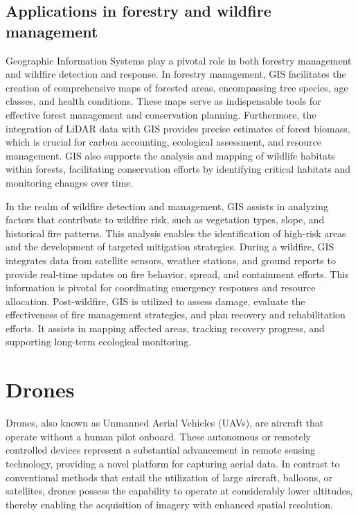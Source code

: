 \documentclass[
  12 pt,
]{Nemilov}
\begin{document}
\subsection{Applications in forestry and wildfire management}\label{applications-in-forestry-and-wildfire-management}

Geographic Information Systems play a pivotal role in both forestry management and wildfire detection and response. In forestry management, GIS facilitates the creation of comprehensive maps of forested areas, encompassing tree species, age classes, and health conditions. These maps serve as indispensable tools for effective forest management and conservation planning. Furthermore, the integration of LiDAR data with GIS provides precise estimates of forest biomass, which is crucial for carbon accounting, ecological assessment, and resource management. GIS also supports the analysis and mapping of wildlife habitats within forests, facilitating conservation efforts by identifying critical habitats and monitoring changes over time.

In the realm of wildfire detection and management, GIS assists in analyzing factors that contribute to wildfire risk, such as vegetation types, slope, and historical fire patterns. This analysis enables the identification of high-risk areas and the development of targeted mitigation strategies. During a wildfire, GIS integrates data from satellite sensors, weather stations, and ground reports to provide real-time updates on fire behavior, spread, and containment efforts. This information is pivotal for coordinating emergency responses and resource allocation. Post-wildfire, GIS is utilized to assess damage, evaluate the effectiveness of fire management strategies, and plan recovery and rehabilitation efforts. It assists in mapping affected areas, tracking recovery progress, and supporting long-term ecological monitoring.

\section{Drones}\label{drones}

Drones, also known as Unmanned Aerial Vehicles (UAVs), are aircraft that operate without a human pilot onboard. These autonomous or remotely controlled devices represent a substantial advancement in remote sensing technology, providing a novel platform for capturing aerial data. In contrast to conventional methods that entail the utilization of large aircraft, balloons, or satellites, drones possess the capability to operate at considerably lower altitudes, thereby enabling the acquisition of imagery with enhanced spatial resolution.
\end{document}
